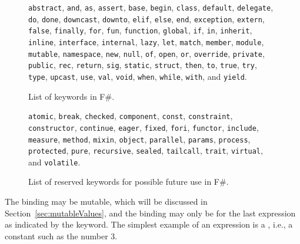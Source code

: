 \begin{figure}
  \mbox{\lstinline{abstract},} \mbox{\lstinline{and},} \mbox{\lstinline{as},} \mbox{\lstinline{assert},} \mbox{\lstinline{base},} \mbox{\lstinline{begin},} \mbox{\lstinline{class},} \mbox{\lstinline{default},} \mbox{\lstinline{delegate},} \mbox{\lstinline{do},} \mbox{\lstinline{done},} \mbox{\lstinline{downcast},} \mbox{\lstinline{downto},} \mbox{\lstinline{elif},} \mbox{\lstinline{else},} \mbox{\lstinline{end},} \mbox{\lstinline{exception},} \mbox{\lstinline{extern},} \mbox{\lstinline{false},} \mbox{\lstinline{finally},} \mbox{\lstinline{for},} \mbox{\lstinline{fun},} \mbox{\lstinline{function},} \mbox{\lstinline{global},} \mbox{\lstinline{if},} \mbox{\lstinline{in},} \mbox{\lstinline{inherit},} \mbox{\lstinline{inline},} \mbox{\lstinline{interface},} \mbox{\lstinline{internal},} \mbox{\lstinline{lazy},} \mbox{\lstinline{let},} \mbox{\lstinline{match},} \mbox{\lstinline{member},} \mbox{\lstinline{module},} \mbox{\lstinline{mutable},} \mbox{\lstinline{namespace},} \mbox{\lstinline{new},} \mbox{\lstinline{null},} \mbox{\lstinline{of},} \mbox{\lstinline{open},} \mbox{\lstinline{or},} \mbox{\lstinline{override},} \mbox{\lstinline{private},} \mbox{\lstinline{public},} \mbox{\lstinline{rec},} \mbox{\lstinline{return},} \mbox{\lstinline{sig},} \mbox{\lstinline{static},} \mbox{\lstinline{struct},} \mbox{\lstinline{then},} \mbox{\lstinline{to},} \mbox{\lstinline{true},} \mbox{\lstinline{try},} \mbox{\lstinline{type},} \mbox{\lstinline{upcast},} \mbox{\lstinline{use},} \mbox{\lstinline{val},} \mbox{\lstinline{void},} \mbox{\lstinline{when},} \mbox{\lstinline{while},} \mbox{\lstinline{with},} and \mbox{\lstinline{yield}.}
  \caption{List of keywords in F\#.}
  \label{fig:keywords}
\end{figure}
\begin{figure}
  \mbox{\lstinline{atomic},} \mbox{\lstinline{break},} \mbox{\lstinline{checked},} \mbox{\lstinline{component},} \mbox{\lstinline{const},} \mbox{\lstinline{constraint},} \mbox{\lstinline{constructor},} \mbox{\lstinline{continue},} \mbox{\lstinline{eager},} \mbox{\lstinline{fixed},} \mbox{\lstinline{fori},} \mbox{\lstinline{functor},} \mbox{\lstinline{include},} \mbox{\lstinline{measure},} \mbox{\lstinline{method},} \mbox{\lstinline{mixin},} \mbox{\lstinline{object},} \mbox{\lstinline{parallel},} \mbox{\lstinline{params},} \mbox{\lstinline{process},} \mbox{\lstinline{protected},} \mbox{\lstinline{pure},} \mbox{\lstinline{recursive},} \mbox{\lstinline{sealed},} \mbox{\lstinline{tailcall},} \mbox{\lstinline{trait},} \mbox{\lstinline{virtual},} and \mbox{\lstinline{volatile}.}
  \caption{List of reserved keywords for possible future use in F\#.}
  \label{fig:reservedKeywords}
\end{figure}
The binding may be mutable, which will be discussed in Section~\ref{sec:mutableValues}, and the binding may only be for the last expression as indicated by the  keyword. The simplest example of an expression is a , i.e., a constant such as the number 3. 

